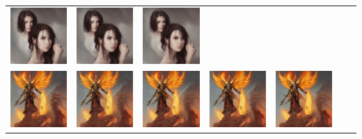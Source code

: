 \begin{table}[!htb]
\begin{tabular}{c c@{}c@{}c@{}c@{}c@{}c}
    \includegraphics[width=0.135\linewidth]{chapter/appendix/def_imgs/woman2/w2_40.png} &
    \includegraphics[width=0.135\linewidth]{chapter/appendix/def_imgs/woman2/w2_50.png} &
    \includegraphics[width=0.135\linewidth]{chapter/appendix/def_imgs/woman2/w2_60.png} \\
    \includegraphics[width=0.135\linewidth]{chapter/appendix/def_imgs/angel/a_0.png} & 
    \includegraphics[width=0.135\linewidth]{chapter/appendix/def_imgs/angel/a_10.png} &
    \includegraphics[width=0.135\linewidth]{chapter/appendix/def_imgs/angel/a_20.png} &
    \includegraphics[width=0.135\linewidth]{chapter/appendix/def_imgs/angel/a_30.png} &
    \includegraphics[width=0.135\linewidth]{chapter/appendix/def_imgs/angel/a_40.png} &

\end{tabular}
\end{table}

